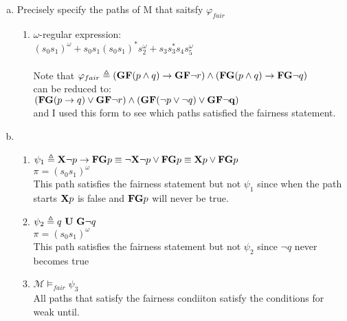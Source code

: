 \documentclass[11pt,leqno,fleqn]{article}
\begin{document}
\begin{enumerate}[(a)]

\item Precisely specify the paths of M that saitsfy $\varphi_{fair}$
	\begin{enumerate}[(1)]

		\item 	
		$\omega$-regular expression:\\
		$(s_0 s_1)^{\omega} + s_0 s_1 (s_0 s_1)^* s_2^{\omega} + s_3 s_3^* s_4 s_5^{\omega}$\\ \\
	Note that $\varphi_{fair} \triangleq (\bold{GF}(p \land q)\to \bold{GF}\neg r) \land (\bold{FG}(p \land q) \to \bold{FG}\neg q)$\\
	can be reduced to: \\
	$(\bold{FG}(p \to q) \lor \bold{GF} \neg r) \land (\bold{GF}(\neg p \lor \neg q) \lor \bold{GF \neg q})$\\
	and I used this form to see which paths satisfied the fairness statement.

		
	\end{enumerate}

\item 
	\begin{enumerate}[(1)]
	
		\item $\psi_1 \triangleq \bold{X}\neg p \to \bold{FG}p \equiv \neg \bold{X}\neg p \lor  \bold{FG}p \equiv \bold{X} p \lor  \bold{FG}p  $\\
		$\pi =(s_0 s_1)^{\omega}$\\
		This path satisfies the fairness statement but not $\psi_1$ since when the path starts $\bold{X}p$ is false and $\bold{FG}p$ will never be true.
	
		\item $\psi_2 \triangleq q \bold{ \ U \ G} \neg q   $\\
		$\pi =(s_0 s_1)^{\omega}$\\
		This path satisfies the fairness statement but not $\psi_2$ since $\neg q$ never becomes true
		\item $\mathcal{M} \models_{fair} \psi_3$\\
		All paths that satisfy the fairness condiiton satisfy the conditions for weak until.
	\end{enumerate}
\end{enumerate}

\newpage
\end{document}
